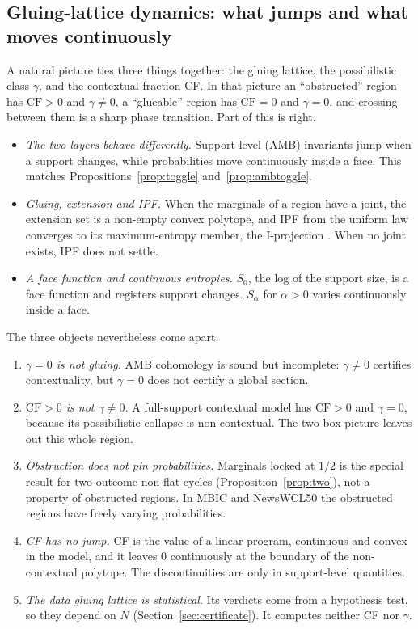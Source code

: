 \documentclass[11pt]{article}
\theoremstyle{definition}
\theoremstyle{remark}
\begin{document}
\subsection{Gluing-lattice dynamics: what jumps and what moves continuously}\label{sec:gldyn}
A natural picture ties three things together: the gluing lattice, the possibilistic class $\gamma$, and the contextual fraction CF. In that picture an ``obstructed'' region has $\mathrm{CF}>0$ and $\gamma\ne0$, a ``glueable'' region has $\mathrm{CF}=0$ and $\gamma=0$, and crossing between them is a sharp phase transition. Part of this is right.
\begin{itemize}
  \item \emph{The two layers behave differently.} Support-level (AMB) invariants jump when a support changes, while probabilities move continuously inside a face. This matches Propositions~\ref{prop:toggle} and~\ref{prop:ambtoggle}.
  \item \emph{Gluing, extension and IPF.} When the marginals of a region have a joint, the extension set is a non-empty convex polytope, and IPF from the uniform law converges to its maximum-entropy member, the I-projection \cite{csiszar}. When no joint exists, IPF does not settle.
  \item \emph{A face function and continuous entropies.} $S_0$, the log of the support size, is a face function and registers support changes. $S_\alpha$ for $\alpha>0$ varies continuously inside a face.
\end{itemize}
The three objects nevertheless come apart:
\begin{enumerate}
  \item \emph{$\gamma=0$ is not gluing.} AMB cohomology is sound but incomplete: $\gamma\ne0$ certifies contextuality, but $\gamma=0$ does not certify a global section.
  \item \emph{$\mathrm{CF}>0$ is not $\gamma\ne0$.} A full-support contextual model has $\mathrm{CF}>0$ and $\gamma=0$, because its possibilistic collapse is non-contextual. The two-box picture leaves out this whole region.
  \item \emph{Obstruction does not pin probabilities.} Marginals locked at $1/2$ is the special result for two-outcome non-flat cycles (Proposition~\ref{prop:two}), not a property of obstructed regions. In MBIC and NewsWCL50 the obstructed regions have freely varying probabilities.
  \item \emph{CF has no jump.} CF is the value of a linear program, continuous and convex in the model, and it leaves $0$ continuously at the boundary of the non-contextual polytope. The discontinuities are only in support-level quantities.
  \item \emph{The data gluing lattice is statistical.} Its verdicts come from a hypothesis test, so they depend on $N$ (Section~\ref{sec:certificate}). It computes neither CF nor $\gamma$.
\end{enumerate}
\end{document}
